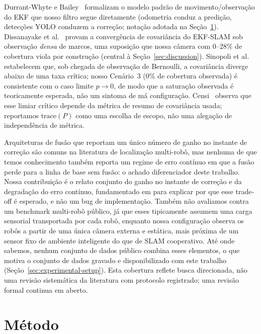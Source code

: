 \documentclass[runningheads]{llncs}
\begin{document}
Durrant-Whyte e Bailey~\cite{bailey2006slam} formalizam o modelo
padrão de movimento/observação do EKF que nosso filtro segue
diretamente (odometria conduz a predição, detecções YOLO conduzem a
correção; notação adotada na Seção~\ref{sec:methodology}). Dissanayake
et al.~\cite{dissanayake2001slam} provam a convergência de covariância
do EKF-SLAM sob observação \emph{densa} de marcos, uma suposição que
nossa câmera com 0--28\% de cobertura viola por construção (central à
Seção~\ref{sec:discussion}). Sinopoli et
al.~\cite{sinopoli2004intermittent} estabelecem que, sob chegada de
observação de Bernoulli, a covariância diverge abaixo de uma taxa
crítica; nosso Cenário~3 (0\% de cobertura observada) é consistente
com o caso limite $p\to0$, de modo que a saturação observada é
teoricamente esperada, não um sintoma de má configuração. Censi~\cite{censi2009geometric}
observa que esse limiar crítico depende da métrica de resumo de
covariância usada; reportamos $\mathrm{trace}(P)$ como uma escolha de
escopo, não uma alegação de independência de métrica.

Arquiteturas de fusão que reportam um único número de ganho no
instante de correção são comuns na literatura de localização
multi-robô, mas nenhuma de que temos conhecimento também reporta um
regime de erro contínuo em que a fusão perde para a linha de base sem
fusão: o achado diferenciador deste trabalho. Nossa contribuição é o
relato conjunto do ganho no instante de correção e da degradação do
erro contínuo, fundamentado em
\cite{sinopoli2004intermittent,censi2009geometric} para explicar por
que esse trade-off é esperado, e não um bug de implementação. Também
não avaliamos contra um benchmark multi-robô público, já que esses
tipicamente assumem uma carga sensorial transportada por cada robô,
enquanto nossa configuração observa os robôs a partir de uma única
câmera externa e estática, mais próxima de um sensor fixo de ambiente
inteligente do que de SLAM cooperativo. Até onde sabemos, nenhum
conjunto de dados público combina esses elementos, o que motiva o
conjunto de dados gravado e disponibilizado com este trabalho
(Seção~\ref{sec:experimental-setup}). Esta cobertura reflete busca
direcionada, não uma revisão sistemática da literatura com protocolo
registrado; uma revisão formal continua em aberto.

\section{Método}
\label{sec:methodology}
\end{document}

